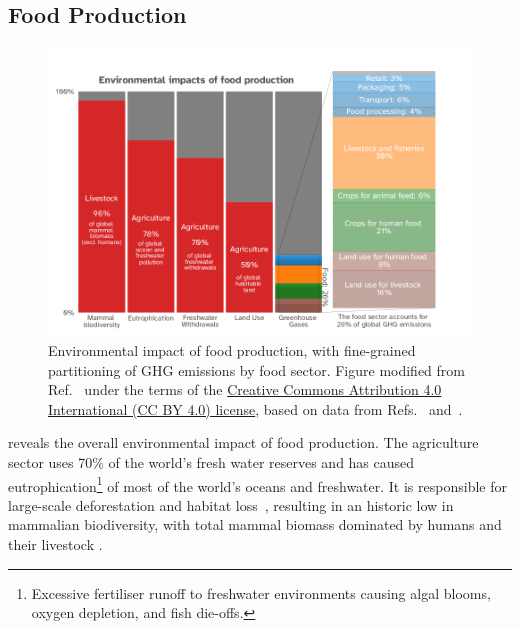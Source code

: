 \documentclass[../SustainableHEP.tex]{subfiles}
\begin{document}
\newpage
\subsection{Food Production\label{sec:agriculture}}

\begin{figure}
    \centering
    \includegraphics[width=\textwidth]{Sections/Figs/Food/FoodEnvironment.png}
    \caption[Environmental impact of food production]{ Environmental impact of food production, with fine-grained partitioning of GHG emissions by food sector. Figure modified from Ref.~\cite{OWID-Food} under the terms of the \href{https://creativecommons.org/licenses/by/4.0/}{Creative Commons Attribution 4.0 International (CC BY 4.0) license}, based on data from Refs.~\cite{PooreNemecek2018} and~\cite{Bar-On6506}.
    \label{fig:food_impact}}
\end{figure}

 reveals the overall environmental impact of food production.  The agriculture sector uses 70\% of the world's fresh water reserves and has caused eutrophication\footnote{Excessive fertiliser runoff to freshwater environments causing algal blooms, oxygen depletion, and fish die-offs.} of most of the world's oceans and freshwater.  It is responsible for large-scale deforestation and habitat loss~\cite{OWID-Food, PooreNemecek2018, Xu2021}, resulting in an historic low in mammalian biodiversity, with total mammal biomass dominated by humans and their livestock \cite{Bar-On6506}. 
\end{document}
